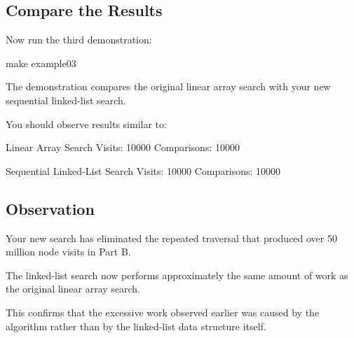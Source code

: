 \documentclass{csc2059practical}
\begin{document}

\subsection{Compare the Results}

Now run the third demonstration:

\begin{terminal}
make example03
\end{terminal}

The demonstration compares the original linear array search with your new
sequential linked-list search.

You should observe results similar to:

\begin{terminal}
Linear Array Search
Visits: 10000
Comparisons: 10000

Sequential Linked-List Search
Visits: 10000
Comparisons: 10000
\end{terminal}


\subsection{Observation}

Your new search has eliminated the repeated traversal that produced over
50 million node visits in Part B.

The linked-list search now performs approximately the same amount of work as
the original linear array search.

This confirms that the excessive work observed earlier was caused by the
algorithm rather than by the linked-list data structure itself.
\end{document}
